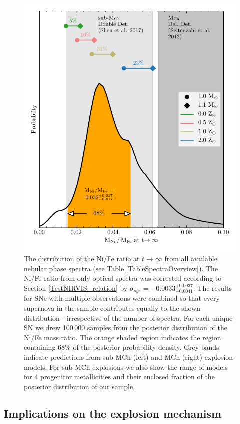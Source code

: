 \documentclass[fleqn,usenatbib]{mnras}
\begin{document}
\begin{figure}
	\includegraphics[width=\linewidth]{plots/NiFe_Distribution.pdf}
    \caption{The distribution of the Ni/Fe ratio at $t\rightarrow\infty$ from all available nebular phase spectra (see Table \ref{TableSpectraOverview}). The Ni/Fe ratio from only optical spectra was corrected according to Section \ref{TestNIRVIS_relation} by $\sigma_{sys}=-0.0033^{+0.0037}_{-0.0041}$. The results for SNe with multiple observations were combined so that every supernova in the sample contributes equally to the shown distribution - irrespective of the number of spectra. For each unique SN we drew 100\,000 samples from the posterior distribution of the Ni/Fe mass ratio. The orange shaded region indicates the region containing 68\% of the posterior probability density. Grey bands indicate predictions from sub-M${\text{Ch}}$ (left) and M${\text{Ch}}$ (right) explosion models. For sub-M${\text{Ch}}$ explosions we also show the range of models for 4 progenitor metallicities and their enclosed fraction of the posterior distribution of our sample.} 
    \label{NiFe_Distribution}
\end{figure}
\subsection{Implications on the explosion mechanism}
\end{document}
